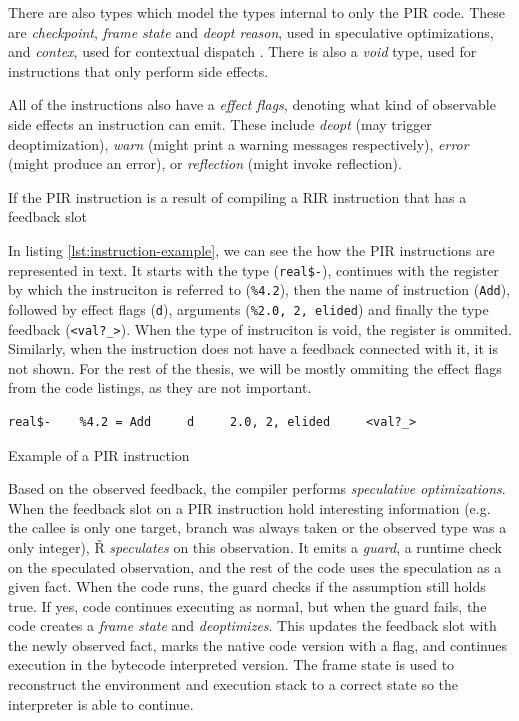 There are also types which model the types internal to only the PIR code. These are \textit{checkpoint}, \textit{frame state} and \textit{deopt reason}, used in speculative optimizations, and \textit{contex}, used for contextual dispatch . There is also a \textit{void} type, used for instructions that only perform side effects.

All of the instructions also have a \textit{effect flags}, denoting what kind of observable side effects an instruction can emit. These include \textit{deopt} (may trigger deoptimization), \textit{warn} (might print a warning messages respectively), \textit{error} (might produce an error), or \textit{reflection} (might invoke reflection). 

If the PIR instruction is a result of compiling a RIR instruction that has a feedback slot 

In listing \ref{lst:instruction-example}, we can see the how the PIR instructions are represented in text. It starts with the type (\texttt{real\$-}), continues with the register by which the instruciton is referred to (\texttt{\%4.2}), then the name of instruction (\texttt{Add}), followed by effect flags (\texttt{d}), arguments (\texttt{\%2.0, 2, elided}) and finally the type feedback (\texttt{<val?\_>}). When the type of instruciton is void, the register is ommited. Similarly, when the instruction does not have a feedback connected with it, it is not shown. For the rest of the thesis, we will be mostly ommiting the effect flags from the code listings, as they are not important.

\begin{listing}[H]
	\begin{verbatim}
real$-    %4.2 = Add     d     2.0, 2, elided     <val?_>
  \end{verbatim}
	\caption{Example of a PIR instruction}\label{lst:instruction-example}
\end{listing}

Based on the observed feedback, the compiler performs \textit{speculative optimizations}. When the feedback slot on a PIR instruction hold interesting information (e.g. the callee is only one target, branch was always taken or the observed type was a only integer), Ř \textit{speculates} on this observation. It emits a \textit{guard}, a runtime check on the speculated observation, and the rest of the code uses the speculation as a given fact. When the code runs, the guard checks if the assumption still holds true. If yes, code continues executing as normal, but when the guard fails, the code creates a \textit{frame state} and \textit{deoptimizes}. This updates the feedback slot with the newly observed fact, marks the native code version with a flag, and continues execution in the bytecode interpreted version. The frame state is used to reconstruct the environment and execution stack to a correct state so the interpreter is able to continue. 

